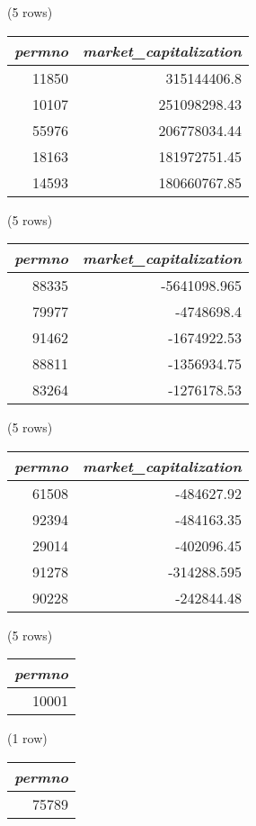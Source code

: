 \noindent (5 rows) \\

\begin{tabular}{r | r}
\textit{permno} & \textit{market\_capitalization} \\
\hline
11850 & 315144406.8 \\
10107 & 251098298.43 \\
55976 & 206778034.44 \\
18163 & 181972751.45 \\
14593 & 180660767.85 \\
\end{tabular}

\noindent (5 rows) \\

\begin{tabular}{r | r}
\textit{permno} & \textit{market\_capitalization} \\
\hline
88335 & -5641098.965 \\
79977 & -4748698.4 \\
91462 & -1674922.53 \\
88811 & -1356934.75 \\
83264 & -1276178.53 \\
\end{tabular}

\noindent (5 rows) \\

\begin{tabular}{r | r}
\textit{permno} & \textit{market\_capitalization} \\
\hline
61508 & -484627.92 \\
92394 & -484163.35 \\
29014 & -402096.45 \\
91278 & -314288.595 \\
90228 & -242844.48 \\
\end{tabular}

\noindent (5 rows) \\

\begin{tabular}{r}
\textit{permno} \\
\hline
10001 \\
\end{tabular}

\noindent (1 row) \\

\begin{tabular}{r}
\textit{permno} \\
\hline
75789 \\
\end{tabular}

